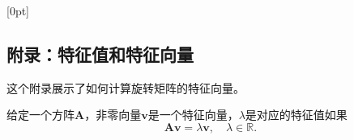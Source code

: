 
\appendix


[0pt]{\addvspace{1.5pt}\filright\bf}%
        {}%
        {}{\contentspage}

\renewcommand{\chaptermark}[1]{\markboth{\begin{CJK}{UTF8}{gkai}#1\end{CJK}}{}}
\renewcommand{\sectionmark}[1]{\markright{\thesection\, #1}}

\begin{CJK}{UTF8}{gkai}
    \chapter{附录：特征值和特征向量}
\end{CJK}

这个附录展示了如何计算旋转矩阵的特征向量。

给定一个方阵$\mathbf{A}$，非零向量$\mathbf{v}$是一个特征向量，$\lambda$是对应的特征值如果
$$
\mathbf{A v}=\lambda \mathbf{v}, \quad \lambda \in \mathbb{R} .
$$

